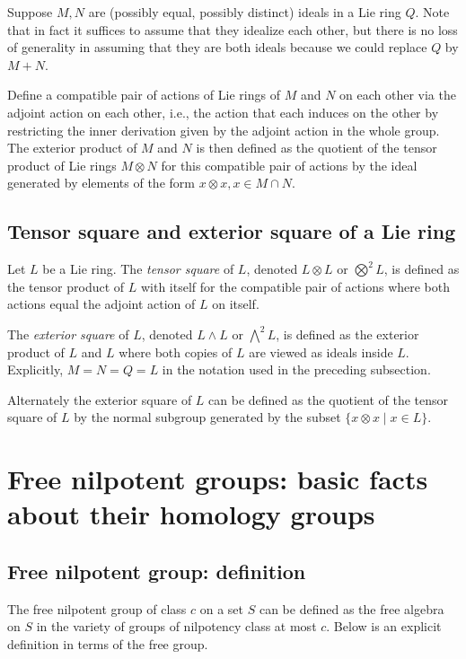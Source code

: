 \documentclass{ucetd}
\begin{document}
Suppose $M,N$ are (possibly equal, possibly distinct) ideals in a Lie
ring $Q$. Note that in fact it suffices to assume that they idealize
each other, but there is no loss of generality in assuming that they
are both ideals because we could replace $Q$ by $M + N$. 

Define a compatible pair of actions of Lie rings of $M$ and $N$ on
each other via the adjoint action on each other, i.e., the action that
each induces on the other by restricting the inner derivation given by
the adjoint action in the whole group. The exterior product of $M$ and
$N$ is then defined as the quotient of the tensor product of Lie rings
$M \otimes N$ for this compatible pair of actions by the ideal
generated by elements of the form $x \otimes x, x \in M \cap N$.

\subsection{Tensor square and exterior square of a Lie ring}

Let $L$ be a Lie ring. The {\em tensor square} of $L$, denoted $L \otimes
L$ or $\bigotimes^2L$, is defined as the tensor product of $L$ with
itself for the compatible pair of actions where both actions equal the
adjoint action of $L$ on itself.

The {\em exterior square} of $L$, denoted $L \wedge L$ or
$\bigwedge^2L$, is defined as the exterior product of $L$ and $L$
where both copies of $L$ are viewed as ideals inside $L$. Explicitly,
$M = N = Q = L$ in the notation used in the preceding subsection.

Alternately the exterior square of $L$ can be defined as the quotient
of the tensor square of $L$ by the normal subgroup generated by the
subset $\{ x \otimes x \mid x \in L \}$.

\section{Free nilpotent groups: basic facts about their homology groups}\label{sec:free-nilpotent-groups-homology}

\subsection{Free nilpotent group: definition}

The free nilpotent group of class $c$ on a set $S$ can be defined as
the free algebra on $S$ in the variety of groups of nilpotency class
at most $c$. Below is an explicit definition in terms of the free
group.
\end{document}
